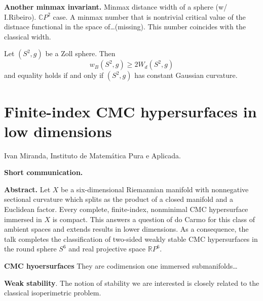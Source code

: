 \medskip\noindent
{\bf Another minmax invariant.}
Minmax distance width of a sphere (w/
I.Ribeiro). $\mathbb{C}P^2$ case.
A minmax number that is nontrivial critical
value of the distnace functional in the
space of…(missing).
This number coincides with the classical
width.

\begin{theorem}[AMM]
\label{theorem-amm10}
Let $(S^2,g)$ be a Zoll sphere.
Then
$$
w_B(S^2,g) \geq  2W_d(S^2,g)
$$
and equality holds if and only if
$(S^2,g)$ has constant Gaussian curvature.
\end{theorem}

\section{Finite-index CMC hypersurfaces
in low dimensions}
\label{section-finite-index-cmc}

\medskip\noindent
Ivan Miranda,
Instituto de Matem\'atica Pura e Aplicada.

\medskip\noindent
{\bf Short communication.}

\medskip\noindent
{\bf Abstract.}
Let $X$ be a six-dimensional Riemannian
manifold with nonnegative sectional
curvature which splits as the product of a
closed manifold and a Euclidean factor.
Every complete, finite-index, nonminimal
CMC hypersurface immersed in $X$ is
compact. This answers a question of
do Carmo for this class of ambient spaces
and extends results in lower dimensions.
As a consequence, the talk completes the
classification of two-sided weakly stable
CMC hypersurfaces in the round sphere
$S^6$ and real projective space
$\mathbb{R}P^6$.

\medskip\noindent
{\bf CMC hyoersurfaces} They are codimension
one immersed submanifolds…

\medskip\noindent
{\bf Weak stability}. The notion of
stability we are interested is closely
related to the classical isoperimetric
problem.

